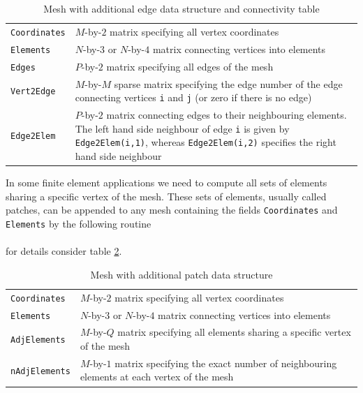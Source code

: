 \begin{table}[htb]
  \begin{tabular}{p{2cm}p{9cm}}
    {\tt Coordinates} & {\small $M$-by-$2$ matrix specifying all vertex coordinates}                \\
    {\tt Elements}    & {\small $N$-by-$3$ or $N$-by-$4$ matrix connecting vertices into elements}  \\
    {\tt Edges}       & {\small $P$-by-$2$ matrix specifying all edges of the mesh}                 \\
    {\tt Vert2Edge}   & {\small $M$-by-$M$ sparse matrix specifying the edge number
                        of the edge connecting vertices {\tt i} and {\tt j} (or zero
                        if there is no edge)}                                                       \\
    {\tt Edge2Elem}   & {\small $P$-by-$2$ matrix connecting edges to their neighbouring
                        elements. The left hand side neighbour of edge {\tt i} is given
                        by {\tt Edge2Elem(i,1)}, whereas {\tt Edge2Elem(i,2)} specifies
                        the right hand side neighbour}
  \end{tabular}
  \caption{Mesh with additional edge data structure and connectivity table}
  \label{tab:MSH_E2}
\end{table}

In some finite element applications we need to compute all sets of elements sharing a specific vertex of the mesh.
These sets of elements, usually called patches, can be appended to any mesh containing the fields {\tt Coordinates}
and {\tt Elements} by the following routine \\

 \\

\noindent for details consider table \ref{tab:MSH_P}.

\begin{table}[htb]
  \begin{tabular}{p{2cm}p{9cm}}
    {\tt Coordinates}  & {\small $M$-by-$2$ matrix specifying all vertex coordinates}                \\
    {\tt Elements}     & {\small $N$-by-$3$ or $N$-by-$4$ matrix connecting vertices into elements}  \\
    {\tt AdjElements}  & {\small $M$-by-$Q$ matrix specifying all elements sharing a
                         specific vertex of the mesh}                                                \\
    {\tt nAdjElements} & {\small $M$-by-$1$ matrix specifying the exact number of
                         neighbouring elements at each vertex of the mesh}
  \end{tabular}
  \caption{Mesh with additional patch data structure}
  \label{tab:MSH_P}
\end{table}


